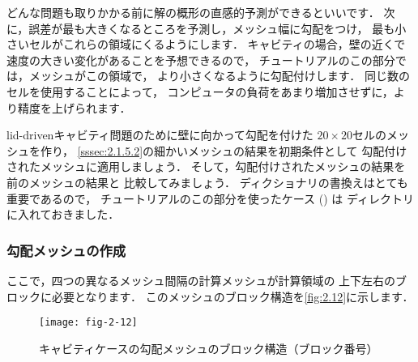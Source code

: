 どんな問題も取りかかる前に解の概形の直感的予測ができるといいです．
次に，誤差が最も大きくなるところを予測し，メッシュ幅に勾配をつけ，
最も小さいセルがこれらの領域にくるようにします．
キャビティの場合，壁の近くで速度の大きい変化があることを予想できるので，
チュートリアルのこの部分では，メッシュがこの領域で，
より小さくなるように勾配付けします．
同じ数のセルを使用することによって，
コンピュータの負荷をあまり増加させずに，より精度を上げられます．

lid-drivenキャビティ問題のために壁に向かって勾配を付けた
$20 \times 20$セルのメッシュを作り，
\autoref{sssec:2.1.5.2}の細かいメッシュの結果を初期条件として
勾配付けされたメッシュに適用しましょう．
そして，勾配付けされたメッシュの結果を前のメッシュの結果と
比較してみましょう．
%
%
ディクショナリの書換えはとても重要であるので，
チュートリアルのこの部分を使ったケース () は
ディレクトリに入れておきました．

\subsubsection{勾配メッシュの作成}
\label{sssec:2.1.6.1}
ここで，四つの異なるメッシュ間隔の計算メッシュが計算領域の
上下左右のブロックに必要となります．
このメッシュのブロック構造を\autoref{fig:2.12}に示します．


\begin{figure}[ht]
 \texttt{[image: fig-2-12]}
 \caption{キャビティケースの勾配メッシュのブロック構造（ブロック番号）}
 \label{fig:2.12}
\end{figure}


